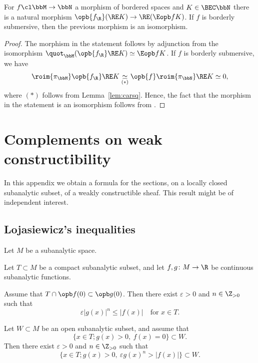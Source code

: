 \begin{lemma}\label{lem:A3}
For $f\cl\bbM\to\bbN$ a morphism of bordered spaces and $K\in\BEC\bbN$
there is a natural morphism $\opb{f_\R}(\RE K)\to\RE(\Eopb f K)$.
If $f$ is borderly submersive, then the previous morphism is an isomorphism.
\end{lemma}
\begin{proof}
The morphism in the statement follows by adjunction from the isomorphism
$\quot_\bbM(\opb{f_\R}\RE K)\simeq\Eopb f K$.
If $f$ is borderly submersive, we have
\begin{equation*}
\roim{{\pi_\bbM}}\opb{f_\R}\RE K
\underset{(*)}\simeq\opb{f}\roim{{\pi_\bbN}}\RE K
\simeq0,
\end{equation*}
where $(*)$ follows from Lemma~\ref{lem:carsq}.
Hence, the fact that the morphism in the statement is an isomorphism follows from \cite[Prop.\,4.4.4(ii-b)]{DK16}.
\end{proof}

\section{Complements on weak constructibility}\label{se:wc}

In this appendix we obtain a formula for the sections, on a locally closed subanalytic subset, of a weakly constructible sheaf. This result might be of independent interest.

\subsection{Lojasiewicz's inequalities}

Let $ M$ be a subanalytic space.

\begin{lemma}\label{lem:Loj}
Let $T\subset M$ be a compact subanalytic subset, and
let $f,g\colon M\to \R$ be continuous subanalytic functions.
\begin{enumeratei}
\item\label{lem:Loji}
Assume that $T\cap\opb f(0)\subset\opb g(0)$. Then there exist $\varepsilon>0$ and $n\in\Z_{>0}$ such that
\[
\varepsilon|g(x)|^n \leq |f(x)| \quad\text{for }x\in T.
\]
\item\label{lem:Lojii}
Let $W\subset M$ be an open subanalytic subset,
and assume that
\begin{equation}\label{eq:Lojhyp}
\{x\in T\semicolon g(x)>0,\ f(x)=0 \} \subset W.
\end{equation}
Then there exist $\varepsilon>0$ and $n\in\Z_{>0}$ such that
\[
\{x\in T\semicolon g(x)>0,\ \varepsilon g(x)^n>|f(x)| \} \subset W.
\]
\end{enumeratei}
\end{lemma}

